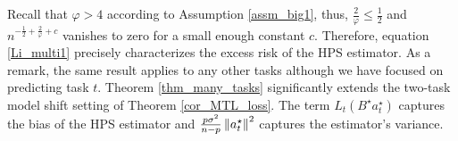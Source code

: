 Recall that $\varphi > 4$ according to Assumption \ref{assm_big1}, thus, $\frac {2}{\varphi} \le \frac 1 2$ and $n^{-\frac 1 2 + \frac 2 {\varphi} + c}$ vanishes to zero for a small enough constant $c$.
Therefore, equation \eqref{Li_multi1} precisely characterizes the excess risk of the HPS estimator.
As a remark, the same result applies to any other tasks although we have focused on predicting task $t$.
Theorem \ref{thm_many_tasks} significantly extends the two-task model shift setting of Theorem \ref{cor_MTL_loss}.
The term $L_t(B^{\star} a_t^{\star})$ captures the bias of the HPS estimator and $\frac{p \sigma^2}{n - p} \left\| a_t^{\star} \right\|^2$ captures the estimator's variance.
